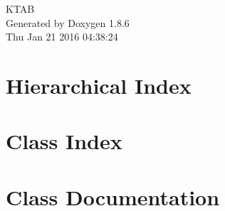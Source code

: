 \documentclass[twoside]{book}
\newcommand{\clearemptydoublepage}{%
  \newpage{\pagestyle{empty}\cleardoublepage}%
}
\begin{document}
\hypersetup{pageanchor=false}
\begin{titlepage}
\vspace*{7cm}
\begin{center}%
{\Large K\-T\-A\-B }\\
\vspace*{1cm}
{\large Generated by Doxygen 1.8.6}\\
\vspace*{0.5cm}
{\small Thu Jan 21 2016 04:38:24}\\
\end{center}
\end{titlepage}
\clearemptydoublepage
\tableofcontents
\clearemptydoublepage
{}
\hypersetup{pageanchor=true}

\chapter{Hierarchical Index}

\chapter{Class Index}

\chapter{Class Documentation}




































\newpage
{}
{}
\printindex
\end{document}

